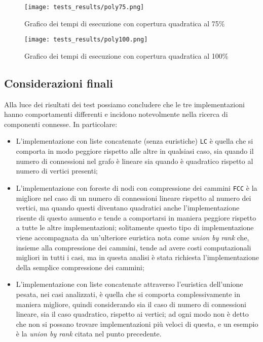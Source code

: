 \begin{figure}[!h]
    \begin{adjustbox}{center}
        \begin{minipage}{0.65\textwidth}
            \centering
            \captionsetup{justification=centering}
            \texttt{[image: tests\_results/poly75.png]}
            \caption{Grafico dei tempi di esecuzione con copertura quadratica al 75\%}
            \label{fig:poly75}
        \end{minipage}\hfill
        \begin{minipage}{0.65\textwidth}
            \centering
            \captionsetup{justification=centering}
            \texttt{[image: tests\_results/poly100.png]}
            \caption{Grafico dei tempi di esecuzione con copertura quadratica al 100\%}
            \label{fig:poly100}
        \end{minipage}
    \end{adjustbox}
\end{figure}
\newpage

\subsection{Considerazioni finali}

Alla luce dei risultati dei test possiamo concludere che le tre implementazioni hanno comportamenti differenti
e incidono notevolmente nella ricerca di componenti connesse. In particolare:

\begin{itemize}
    \item L'implementazione con liste concatenate (senza euristiche) \texttt{LC} è quella che si comporta in modo peggiore
          rispetto alle altre in qualsiasi caso, sia quando il numero di connessioni nel grafo è lineare sia quando è quadratico
          rispetto al numero di vertici presenti;
    \item L'implementazione con foreste di nodi con compressione dei cammini \texttt{FCC} è la migliore nel caso di un numero
          di connessioni lineare rispetto al numero dei vertici, ma quando questi diventano quadratici anche l'implementazione risente
          di questo aumento e tende a comportarsi in maniera peggiore rispetto a tutte le altre implementazioni; solitamente questo tipo
          di implementazione viene accompagnata da un'ulteriore euristica nota come \textit{union by rank} che, insieme alla compressione
          dei cammini, tende ad avere costi computazionali migliori in tutti i casi, ma in questa analisi è stata richiesta l'implementazione
          della semplice compressione dei cammini;
    \item L'implementazione con liste concatenate attraverso l'euristica dell'unione pesata, nei casi analizzati, è quella che si comporta
          complessivamente in maniera migliore, quindi considerando sia il caso di numero di connessioni lineare, sia il caso quadratico,
          rispetto ai vertici; ad ogni modo non è detto che non si possano trovare implementazioni più veloci di questa, e un esempio è la
          \textit{union by rank} citata nel punto precedente.
\end{itemize}

